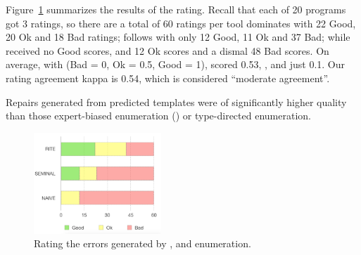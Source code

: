 %
Figure~\ref{fig:comparison} summarizes the results of the rating.
%
Recall that each of 20 programs got 3 ratings, so there are a 
total of 60 ratings per tool
%
\toolname dominates with 22 Good, 20 Ok and 18 Bad ratings;
\seminal follows with only 12 Good, 11 Ok and 37 Bad; while 
\naive received no Good scores, and 12 Ok scores and a 
dismal 48 Bad scores.
%
On average, with (Bad = 0, Ok = 0.5, Good = 1), 
\toolname scored 0.53, , and \naive 
just 0.1.
%
Our rating agreement kappa is 0.54, which is considered ``moderate agreement''.

\begin{framed}
  \noindent Repairs generated from predicted 
  templates were of significantly higher quality 
  than those expert-biased enumeration (\seminal) 
  or \naive type-directed enumeration.
\end{framed}

\begin{figure}[t]
  \centering
  \includegraphics[height=1.5in]{comparison.png}
  \caption{Rating the errors generated by \toolname, \seminal and \naive enumeration.}
  \label{fig:comparison}
\end{figure}

